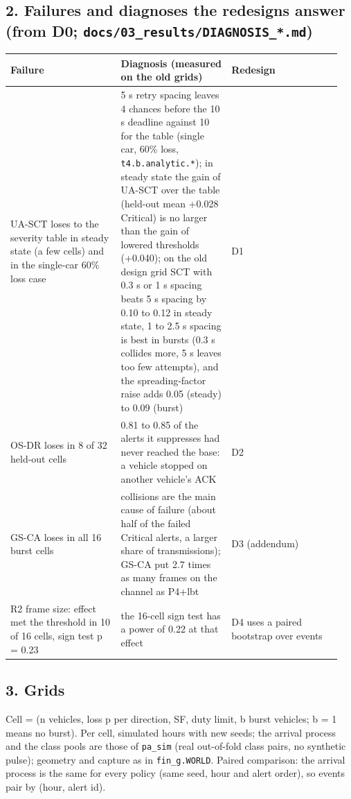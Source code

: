 \subsection*{2. Failures and diagnoses the redesigns answer (from D0; \texttt{docs/03\_results/DIAGNOSIS\_*.md})}
{\scriptsize\raggedright
\begin{longtable}{p{0.317\linewidth}p{0.317\linewidth}p{0.317\linewidth}}
\toprule
Failure & Diagnosis (measured on the old grids) & Redesign \\
\midrule
\endhead
UA-SCT loses to the severity table in steady state (a few cells) and in the single-car 60\% loss case & 5 s retry spacing leaves 4 chances before the 10 s deadline against 10 for the table (single car, 60\% loss, \texttt{t4.b.analytic.*}); in steady state the gain of UA-SCT over the table (held-out mean +0.028 Critical) is no larger than the gain of lowered thresholds (+0.040); on the old design grid SCT with 0.3 s or 1 s spacing beats 5 s spacing by 0.10 to 0.12 in steady state, 1 to 2.5 s spacing is best in bursts (0.3 s collides more, 5 s leaves too few attempts), and the spreading-factor raise adds 0.05 (steady) to 0.09 (burst) & D1 \\
OS-DR loses in 8 of 32 held-out cells & 0.81 to 0.85 of the alerts it suppresses had never reached the base: a vehicle stopped on another vehicle's ACK & D2 \\
GS-CA loses in all 16 burst cells & collisions are the main cause of failure (about half of the failed Critical alerts, a larger share of transmissions); GS-CA put 2.7 times as many frames on the channel as P4+lbt & D3 (addendum) \\
R2 frame size: effect met the threshold in 10 of 16 cells, sign test p = 0.23 & the 16-cell sign test has a power of 0.22 at that effect & D4 uses a paired bootstrap over events \\
\bottomrule
\end{longtable}}

\subsection*{3. Grids}
Cell = (n vehicles, loss p per direction, SF, duty limit, b burst vehicles; b = 1 means no burst). Per cell, simulated hours with new seeds; the arrival process and the class pools are those of \texttt{pa\_sim} (real out-of-fold class pairs, no synthetic pulse); geometry and capture as in \texttt{fin\_g.WORLD}. Paired comparison: the arrival process is the same for every policy (same seed, hour and alert order), so events pair by (hour, alert id).

